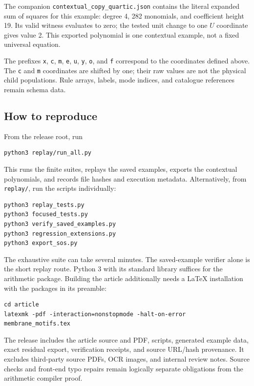 \documentclass[11pt,letterpaper]{article}
\theoremstyle{definition}
\theoremstyle{remark}
\newcommand{\file}[1]{\nolinkurl{#1}}
\begin{document}
The companion \file{contextual_copy_quartic.json} contains the literal expanded sum of squares for this example: degree 4, 282 monomials, and coefficient height 19. Its valid witness evaluates to zero; the tested unit change to one $U$ coordinate gives value 2. This exported polynomial is one contextual example, not a fixed universal equation.

The prefixes \file{x}, \file{c}, \file{m}, \file{e}, \file{u}, \file{y}, \file{o}, and \file{f} correspond to the coordinates defined above. The \file{c} and \file{m} coordinates are shifted by one; their raw values are not the physical child populations. Rule arrays, labels, mode indices, and catalogue references remain schema data.

\subsection{How to reproduce}
From the release root, run
\begin{lstlisting}
python3 replay/run_all.py
\end{lstlisting}
This runs the finite suites, replays the saved examples, exports the contextual polynomials, and records file hashes and execution metadata. Alternatively, from \file{replay/}, run the scripts individually:
\begin{lstlisting}
python3 replay_tests.py
python3 focused_tests.py
python3 verify_saved_examples.py
python3 regression_extensions.py
python3 export_sos.py
\end{lstlisting}
The exhaustive suite can take several minutes. The saved-example verifier alone is the short replay route. Python 3 with its standard library suffices for the arithmetic package. Building the article additionally needs a LaTeX installation with the packages in its preamble:
\begin{lstlisting}
cd article
latexmk -pdf -interaction=nonstopmode -halt-on-error membrane_motifs.tex
\end{lstlisting}

The release includes the article source and PDF, scripts, generated example data, exact residual export, verification receipts, and source URL/hash provenance. It excludes third-party source PDFs, OCR images, and internal review notes. Source checks and front-end typo repairs remain logically separate obligations from the arithmetic compiler proof.
\end{document}
